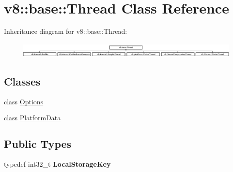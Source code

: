 \hypertarget{classv8_1_1base_1_1_thread}{}\section{v8\+:\+:base\+:\+:Thread Class Reference}
\label{classv8_1_1base_1_1_thread}
Inheritance diagram for v8\+:\+:base\+:\+:Thread\+:\begin{figure}[H]
\begin{center}
\leavevmode
\includegraphics[height=0.825959cm]{classv8_1_1base_1_1_thread}
\end{center}
\end{figure}
\subsection*{Classes}
\begin{DoxyCompactItemize}
\item 
class \hyperlink{classv8_1_1base_1_1_thread_1_1_options}{Options}
\item 
class \hyperlink{classv8_1_1base_1_1_thread_1_1_platform_data}{Platform\+Data}
\end{DoxyCompactItemize}
\subsection*{Public Types}
\begin{DoxyCompactItemize}
\item 
typedef int32\+\_\+t {\bfseries Local\+Storage\+Key}\hypertarget{classv8_1_1base_1_1_thread_a7cc230d1c9c2c354fb0f6032813f9d0f}{}\label{classv8_1_1base_1_1_thread_a7cc230d1c9c2c354fb0f6032813f9d0f}

\end{DoxyCompactItemize}
